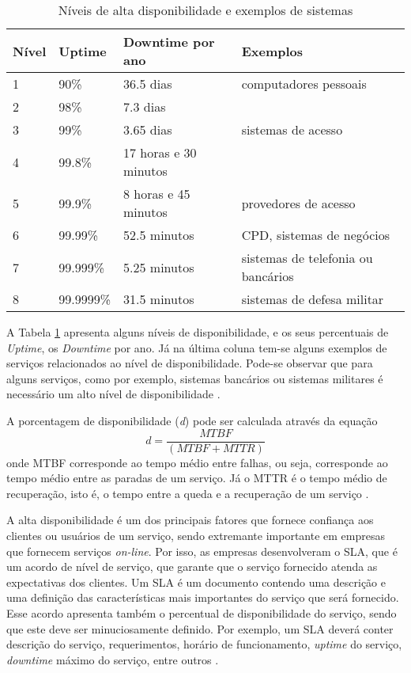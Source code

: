 \begin{table}
\caption {Níveis de alta disponibilidade e exemplos de sistemas}
\label{tab:dispniveis}
\begin{center}
\begin{tabular}{|l|l|l|l|}\hline
Nível & Uptime & Downtime por ano & Exemplos\\\hline
1 & 90\% & 36.5 dias & computadores pessoais\\\hline
2 & 98\% & 7.3 dias & \\\hline
3 & 99\% & 3.65 dias & sistemas de acesso\\\hline
4 & 99.8\% & 17 horas e 30 minutos & \\\hline
5 & 99.9\% & 8 horas e 45 minutos & provedores de acesso\\\hline
6 & 99.99\% & 52.5 minutos & CPD, sistemas de negócios\\\hline
7 & 99.999\% & 5.25 minutos & sistemas de telefonia ou bancários\\\hline
8 & 99.9999\% & 31.5 minutos & sistemas de defesa militar\\\hline
\end{tabular}
\end{center}
\end{table}

A Tabela \ref{tab:dispniveis} apresenta alguns níveis de disponibilidade, e os seus percentuais de \textit{Uptime}, os \textit{Downtime} por ano. 
Já na última coluna tem-se alguns exemplos de serviços relacionados ao nível de disponibilidade. Pode-se observar que para alguns serviços, 
como por exemplo, sistemas bancários ou sistemas militares é necessário um alto nível de disponibilidade \cite{pereirafilho2004}.

A porcentagem de disponibilidade (\textit{d}) pode ser calculada através da equação
\begin{equation}
d = \frac{MTBF}{(MTBF + MTTR)}
\label{disponibilidade}
\end{equation}
onde \ac{MTBF} corresponde ao tempo médio entre falhas, ou seja, corresponde ao tempo médio entre as paradas de um serviço. Já o \ac{MTTR} é o 
tempo médio de recuperação, isto é, o tempo entre a queda e a recuperação de um serviço \cite{goncalves2009}.

A alta disponibilidade é um dos principais fatores que fornece confiança aos clientes ou usuários de um serviço, sendo extremante importante 
em empresas que fornecem serviços \textit{on-line}. Por isso, as empresas desenvolveram o \ac{SLA}, que é um acordo de nível de serviço, 
que garante que o serviço fornecido atenda as expectativas dos clientes. Um \ac{SLA} é um documento contendo uma descrição e uma definição 
das características mais importantes do serviço que será fornecido. Esse acordo apresenta também o percentual de disponibilidade do serviço, 
sendo que este deve ser minuciosamente definido. Por exemplo, um \ac{SLA} deverá conter descrição do serviço, requerimentos, 
horário de funcionamento, \textit{uptime} do serviço, \textit{downtime} máximo do serviço, entre outros \cite{smith2010}.

